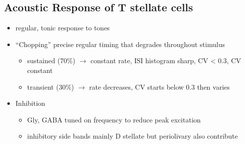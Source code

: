 






\subsection{Acoustic Response of T stellate cells}




\begin{itemize}
\item regular, tonic response to tones \citep{RhodeOertelEtAl:1983,SmithRhode:1989,BlackburnSachs:1989}
\item ``Chopping'' precise regular timing that degrades throughout stimulus\citep{YoungRobertEtAl:1988,BlackburnSachs:1989}
\begin{itemize}
\item sustained (70\%) $\rightarrow$ constant rate, ISI histogram sharp, CV < 0.3, CV constant
\item transient (30\%) $\rightarrow$ rate decreases, CV starts below 0.3 then varies
\end{itemize}
\item Inhibition
\begin{itemize}
\item Gly, GABA tuned on frequency to reduce peak excitation \citep{CasparyBackoffEtAl:1994}
\item inhibitory side bands mainly D stellate \citep{FerragamoGoldingEtAl:1998a} but periolivary also contribute \citep{AdamsWarr:1976,Adams:1983,ShoreHelfertEtAl:1991,OstapoffBensonEtAl:1997}
\end{itemize}
\end{itemize}
\citep{PalombiCaspary:1992,RhodeSmith:1986,NelkenYoung:1994,PaoliniClareyEtAl:2005,PaoliniClareyEtAl:2004}

